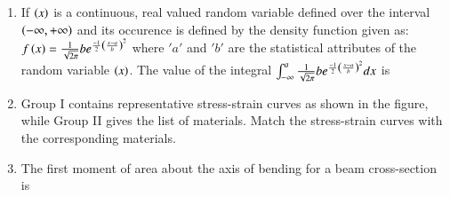 \documentclass[journal,12pt,onecolumn]{IEEEtran}
\theoremstyle{remark}
\begin{document}
\begin{enumerate}
\item If $\left(x\right)$ is a continuous, real valued random variable defined over the interval $\left(-\infty, + \infty\right)$ and its occurence is defined by the density function given as: $f\left(x\right) = \frac{1}{\sqrt{2 \pi}}b e^{\frac{-1}{2} {\left(\frac{x - a}{b}\right)}^{2}}$ where $'a'$ and $'b'$ are the statistical attributes of the random variable $\left(x\right)$. The value of the integral $\int_{-\infty}^{a} \frac{1}{\sqrt{2 \pi}}b e^{\frac{-1}{2} {\left(\frac{x - a}{b}\right)}^{2}} dx$ is 

\begin{enumerate}
\end{enumerate}

\item Group I contains representative stress-strain curves as shown in the figure, while Group II gives the list of materials. Match the stress-strain  curves with the corresponding materials.




    \begin{enumerate}
    \end{enumerate}

\item The first moment of area about the axis of bending for a beam cross-section is
   \begin{enumerate}
    \end{enumerate}


\end{enumerate}
\end{document}
